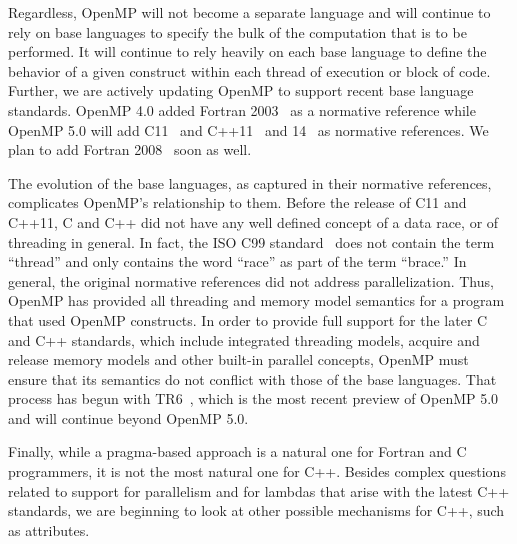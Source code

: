 Regardless, OpenMP will not become a separate language and will 
continue to rely on base languages to specify the bulk of the
computation that is to be performed. It will continue to rely heavily 
on each base language to define the behavior of a given construct 
within each thread of execution or block of code. Further, we are
actively updating OpenMP to support recent base language standards. 
OpenMP 4.0 added Fortran 2003~\cite{F2003} as a normative reference
while OpenMP 5.0 will add C11~\cite{c11} and C++11~\cite{c++11} and
14~\cite{c++14} as normative references. We plan to add Fortran 
2008~\cite{F2008} soon as well.

The evolution of the base languages, as captured in their normative
references, complicates OpenMP's relationship to them. Before the 
release of C11 and C++11, C and C++ did not have any well defined 
concept of a data race, or of threading in general. In fact, the 
ISO C99 standard~\cite{c99} does not contain the term ``thread'' 
and only contains the word ``race'' as part of the term ``brace.''
In general, the original normative references did not address
parallelization. Thus, OpenMP has provided all threading and memory 
model semantics for a program that used OpenMP constructs. In 
order to provide full support for the later C and C++ standards, 
which include integrated threading models, acquire and release 
memory models and other built-in parallel concepts, OpenMP must 
ensure that its semantics do not conflict with those of the base
languages. That process has begun with TR6~\cite{openmptr6}, which is 
the most recent preview of OpenMP 5.0 and will continue beyond
OpenMP 5.0.

Finally, while a pragma-based approach is a natural one for Fortran
and C programmers, it is not the most natural one for C++. Besides
complex questions related to support for parallelism and for lambdas
that arise with the latest C++ standards, we are beginning to look at
other possible mechanisms for C++, such as attributes.


